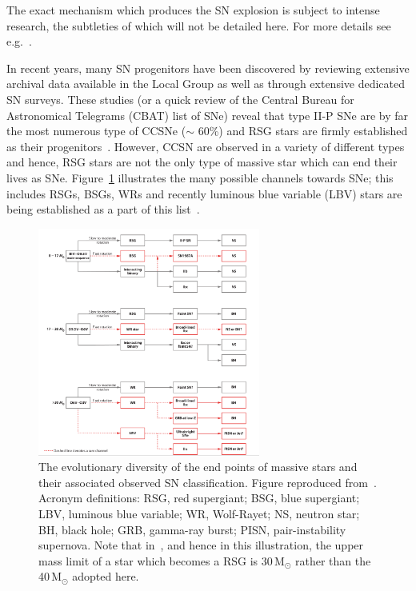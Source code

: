 The exact mechanism which produces the SN explosion is subject to intense research, the subtleties of which will not be detailed here.
For more details see e.g.~\cite{Janka12, Burrows13,2015PASA...32....9F}.

In recent years, many SN progenitors have been discovered by reviewing extensive archival data available in the Local Group as well as through extensive dedicated SN surveys.
These studies (or a quick review of the Central Bureau for Astronomical Telegrams (CBAT) list of SNe\footnotemark) reveal that type II-P SNe are by far the most numerous type of CCSNe ($\sim$ 60\%) and RSG stars are firmly established as their progenitors~\citep[][and references therein]{Smartt09}.
However, CCSN are observed in a variety of different types and hence, RSG stars are not the only type of massive star which can end their lives as SNe.
Figure~\ref{fig:SNe-Smartt} illustrates the many possible channels towards SNe; this includes RSGs, BSGs, WRs and recently luminous blue variable (LBV) stars are being established as a part of this list~\citep[e.g.][]{Smartt09, Groh13}.

 \begin{figure}
 \centering
 \includegraphics[width=0.65\textwidth]{intro/Smartt09fig12}
 \caption[Endpoints of massive stars]{The evolutionary diversity of the end points of massive stars and their associated observed SN classification. Figure reproduced from~\cite{Smartt09}. Acronym definitions: RSG, red supergiant; BSG, blue supergiant; LBV, luminous blue variable; WR, Wolf-Rayet; NS, neutron star; BH, black hole; GRB, gamma-ray burst; PISN, pair-instability supernova.
 Note that in~\citep{Smartt09}, and hence in this illustration, the upper mass limit of a star which becomes a RSG is 30\,M$_{\odot}$ rather than the 40\,M$_{\odot}$ adopted here.
 \label{fig:SNe-Smartt}}
\end{figure}


